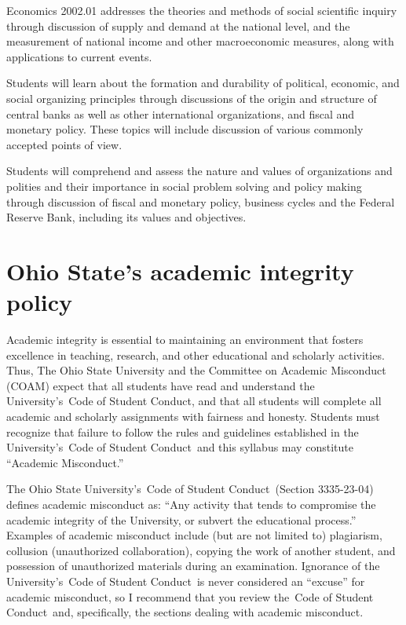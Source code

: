 \documentclass[12pt]{article}
\begin{document}
Economics 2002.01 addresses the theories and methods of social scientific inquiry through discussion of supply and demand at the national level, and the measurement of national income and other macroeconomic measures, along with applications to current events.

Students will learn about the formation and durability of political, economic, and social organizing principles through discussions of the origin and structure of central banks as well as other international organizations, and fiscal and monetary policy. These topics will include discussion of various commonly accepted points of view.

Students will comprehend and assess the nature and values of organizations and polities and their importance in social problem solving and policy making through discussion of fiscal and monetary policy, business cycles and the Federal Reserve Bank, including its values and objectives.



\newpage

\section*{Ohio State’s academic integrity policy}

Academic integrity is essential to maintaining an environment that fosters excellence in teaching, research, and other educational and scholarly activities.
Thus, The Ohio State University and the Committee on Academic Misconduct (COAM) expect that all students have read and understand the University’s Code of Student Conduct, and that all students will complete all academic and scholarly assignments with fairness and honesty.
Students must recognize that failure to follow the rules and guidelines established in the University’s Code of Student Conduct and this syllabus may constitute ``Academic Misconduct.''

The Ohio State University’s Code of Student Conduct (Section 3335-23-04) defines academic misconduct as: ``Any activity that tends to compromise the academic integrity of the University, or subvert the educational process.''
Examples of academic misconduct include (but are not limited to) plagiarism, collusion (unauthorized collaboration), copying the work of another student, and possession of unauthorized materials during an examination.
Ignorance of the University’s Code of Student Conduct is never considered an ``excuse'' for academic misconduct, so I recommend that you review the Code of Student Conduct and, specifically, the sections dealing with academic misconduct.
\end{document}
